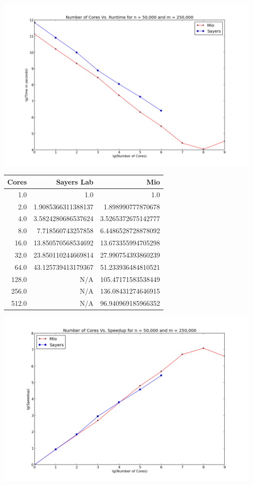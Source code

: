 \documentclass[letterpaper, 12pt]{article}
\begin{document}
	\includegraphics[width=.75\linewidth]{ProjectFiles/results/plots/coresVtime.png}
	
	\begin{tabular}{r|rr}
  Cores              &Sayers Lab                     &Mio \\ 
	\hline
		  1.0                     &1.0                     &1.0 \\ 
		  2.0      &1.9085366311388137       &1.898990777870678 \\ 
		  4.0      &3.5824280686537624      &3.5265372675142777 \\ 
		  8.0       &7.718560743257858      &6.4486528728878092 \\ 
		 16.0      &13.850570568534692      &13.673355994705298 \\ 
		 32.0      &23.850110244669814      &27.990754393860239 \\ 
		 64.0      &43.125739413179367      &51.233936484810521 \\ 
		128.0                     &N/A      &105.47171583538449 \\ 
		256.0                     &N/A      &136.08431274646915 \\ 
		512.0                     &N/A      &96.940969185966352 \\ 
	\end{tabular}
	
	\includegraphics[width=.75\linewidth]{ProjectFiles/results/plots/coresVspeedup.png}
	
\end{document}
